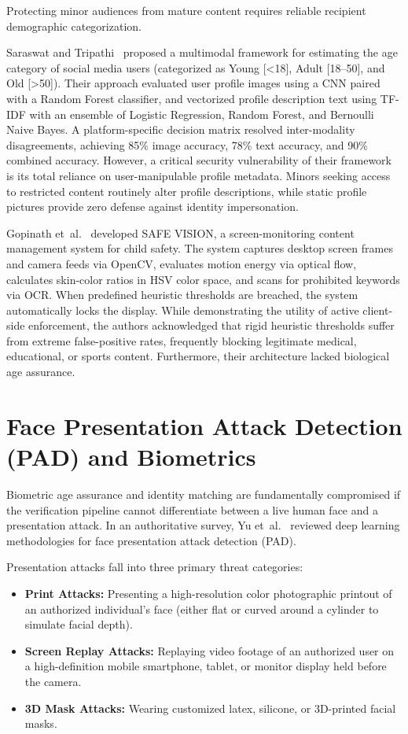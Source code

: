 \documentclass[12pt,a4paper]{report}
\begin{document}
Protecting minor audiences from mature content requires reliable recipient demographic categorization.

Saraswat and Tripathi~\cite{saraswat2026} proposed a multimodal framework for estimating the age category of social media users (categorized as Young [<18], Adult [18--50], and Old [>50]). Their approach evaluated user profile images using a CNN paired with a Random Forest classifier, and vectorized profile description text using TF-IDF with an ensemble of Logistic Regression, Random Forest, and Bernoulli Naive Bayes. A platform-specific decision matrix resolved inter-modality disagreements, achieving 85\% image accuracy, 78\% text accuracy, and 90\% combined accuracy. However, a critical security vulnerability of their framework is its total reliance on user-manipulable profile metadata. Minors seeking access to restricted content routinely alter profile descriptions, while static profile pictures provide zero defense against identity impersonation.

Gopinath et~al.~\cite{safevision2026} developed SAFE VISION, a screen-monitoring content management system for child safety. The system captures desktop screen frames and camera feeds via OpenCV, evaluates motion energy via optical flow, calculates skin-color ratios in HSV color space, and scans for prohibited keywords via OCR. When predefined heuristic thresholds are breached, the system automatically locks the display. While demonstrating the utility of active client-side enforcement, the authors acknowledged that rigid heuristic thresholds suffer from extreme false-positive rates, frequently blocking legitimate medical, educational, or sports content. Furthermore, their architecture lacked biological age assurance.

\section{Face Presentation Attack Detection (PAD) and Biometrics}

Biometric age assurance and identity matching are fundamentally compromised if the verification pipeline cannot differentiate between a live human face and a presentation attack. In an authoritative survey, Yu et~al.~\cite{yu2023} reviewed deep learning methodologies for face presentation attack detection (PAD).

Presentation attacks fall into three primary threat categories:
\begin{itemize}
    \item \textbf{Print Attacks:} Presenting a high-resolution color photographic printout of an authorized individual's face (either flat or curved around a cylinder to simulate facial depth).
    \item \textbf{Screen Replay Attacks:} Replaying video footage of an authorized user on a high-definition mobile smartphone, tablet, or monitor display held before the camera.
    \item \textbf{3D Mask Attacks:} Wearing customized latex, silicone, or 3D-printed facial masks.
\end{itemize}
\end{document}
